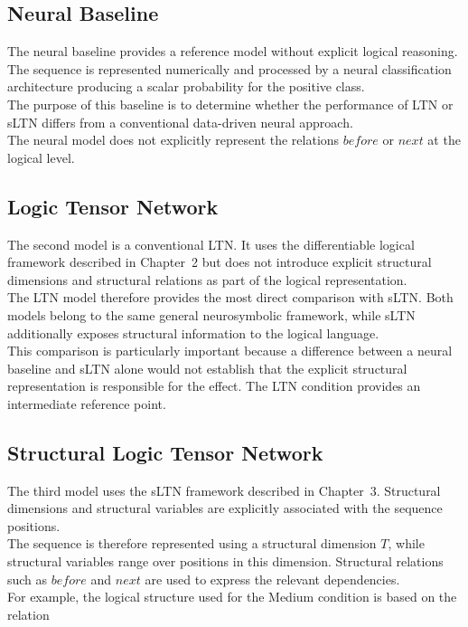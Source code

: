 \subsection{Neural Baseline}

\noindent
The neural baseline provides a reference model without explicit logical reasoning. The sequence is represented numerically and processed by a neural classification architecture producing a scalar probability for the positive class.
\\
The purpose of this baseline is to determine whether the performance of LTN or sLTN differs from a conventional data-driven neural approach.
\\
The neural model does not explicitly represent the relations $before$ or $next$ at the logical level.

\subsection{Logic Tensor Network}

\noindent
The second model is a conventional LTN. It uses the differentiable logical framework described in Chapter~2 but does not introduce explicit structural dimensions and structural relations as part of the logical representation.
\\
The LTN model therefore provides the most direct comparison with sLTN. Both models belong to the same general neurosymbolic framework, while sLTN additionally exposes structural information to the logical language.
\\
This comparison is particularly important because a difference between a neural baseline and sLTN alone would not establish that the explicit structural representation is responsible for the effect. The LTN condition provides an intermediate reference point.

\subsection{Structural Logic Tensor Network}

\noindent
The third model uses the sLTN framework described in Chapter~3. Structural dimensions and structural variables are explicitly associated with the sequence positions.
\\
The sequence is therefore represented using a structural dimension $T$, while structural variables range over positions in this dimension. Structural relations such as $before$ and $next$ are used to express the relevant dependencies.
\\
For example, the logical structure used for the Medium condition is based on the relation

